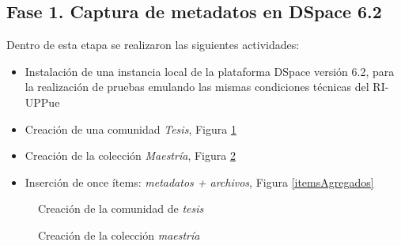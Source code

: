 \subsection{Fase 1. Captura de metadatos en DSpace 6.2}

Dentro de esta etapa se realizaron las siguientes actividades:

\begin{itemize}
    \item Instalaci\'on de una instancia local de la plataforma DSpace versi\'on 6.2, para la realizaci\'on de pruebas emulando las mismas condiciones t\'ecnicas del RI-UPPue
    \item Creaci\'on de una comunidad \textit{Tesis}, Figura \ref{creacionComunidad}
    \item Creaci\'on de la colecci\'on \textit{Maestr\'ia}, Figura \ref{creacionColeccion}
    \item Inserci\'on de once \'items: \textit{metadatos + archivos}, Figura \ref{itemsAgregados}
\end{itemize}{}

\begin{figure}[!ht]
	\centering
    \caption{Creaci\'on de la comunidad de \textit{tesis}}
    \label{creacionComunidad}
\end{figure}

\begin{figure}[!ht]
	\centering
    \caption{Creaci\'on de la colecci\'on \textit{maestr\'ia}}
    \label{creacionColeccion}
\end{figure}

